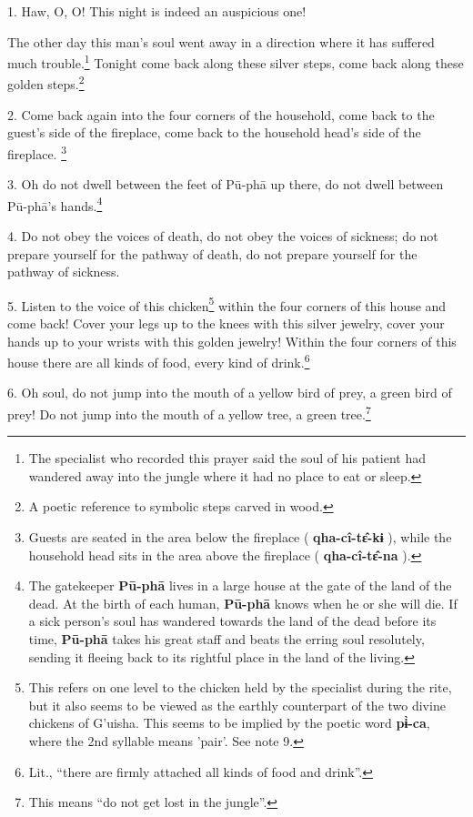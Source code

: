 \setcounter{footnote}{0}

1. Haw, O, O! This night is indeed an auspicious one!

The other day this man's soul went away in a direction where it has suffered much
trouble.\footnote{The specialist who recorded this prayer said the soul of his patient had wandered away into the jungle where it had no place to eat or sleep.} Tonight come back along these silver steps, come back along these
golden steps.\footnote{A poetic reference to symbolic steps carved in wood.}

2. Come back again into the four corners of the household, come back to the guest's
side of the fireplace, come back to the household head's side of the fireplace.
\footnote{Guests are seated in the area below the fireplace ( \textbf{qha-cî-tɛ̂-kɨ} ), while the household head sits in the area above the fireplace ( \textbf{qha-cî-tɛ̂-na} ).}

3. Oh do not dwell between the feet of Pū-phā up there, do not dwell between
Pū-phā's hands.\footnote{The gatekeeper \textbf{Pū-phā} lives in a large house at the gate of the land of the dead. At the birth of each human, \textbf{Pū-phā} knows when he or she will die. If a sick person's soul has wandered towards the land of the dead before its time, \textbf{Pū-phā} takes his great staff and beats the erring soul resolutely, sending it fleeing back to its rightful place in the land of the living.}

4. Do not obey the voices of death, do not obey the voices of sickness; do not prepare
yourself for the pathway of death, do not prepare yourself for the pathway of sickness.

5. Listen to the voice of this chicken\footnote{This refers on one level to the chicken held by the specialist during the rite, but it also seems to be viewed as the earthly counterpart of the two divine chickens of G'uisha. This seems to be implied by the poetic word \textbf{pɨ̀-ca}, where the 2nd syllable means 'pair'. See note 9.} within the four corners of this house
and come back! Cover your legs up to the knees with this silver jewelry, cover
your hands up to your wrists with this golden jewelry! Within the four corners
of this house there are all kinds of food, every kind of drink.\footnote{Lit., ``there are firmly attached all kinds of food and drink''.}

6. Oh soul, do not jump into the mouth of a yellow bird of prey, a green bird of
prey! Do not jump into the mouth of a yellow tree, a green tree.\footnote{This means ``do not get lost in the jungle''.}

